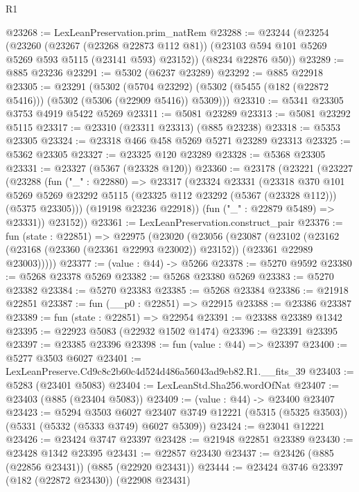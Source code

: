 \begin{lexlean}{R1}
\begin{coremodule}
@23268 := LexLeanPreservation.prim_natRem
@23288 := @23244
    (@23254
      (@23260
        (@23267 (@23268 @22873 @112 @81))
        (@23103 @594 @101 @5269 @5269 @593 @5115 (@23141 @593) @23152))
      (@8234 @22876 @50))
@23289 := @885 @23236
@23291 := @5302 (@6237 @23289)
@23292 := @885 @22918
@23305 := @23291
    (@5302
      (@5704 @23292)
      (@5302 (@5455 (@182 (@22872 @5416))) (@5302 (@5306 (@22909 @5416)) @5309)))
@23310 := @5341 @23305 @3753 @4919 @5422 @5269
@23311 := @5081 @23289
@23313 := @5081 @23292 @5115
@23317 := @23310 (@23311 @23313) (@885 @23238)
@23318 := @5353 @23305
@23324 := @23318 @466 @458 @5269 @5271 @23289 @23313
@23325 := @5362 @23305
@23327 := @23325 @120 @23289
@23328 := @5368 @23305
@23331 := @23327 (@5367 (@23328 @120))
@23360 := @23178
    (@23221
      (@23227
        (@23288
          (fun ("_" : @22880) =>
          @23317
            (@23324
              @23331
              (@23318
                @370
                @101
                @5269
                @5269
                @23292
                @5115
                (@23325 @112 @23292 (@5367 (@23328 @112)))
                (@5375 @23305)))
            (@19198 @23236 @22918))
          (fun ("_" : @22879 @5489) => @23331))
        @23152))
@23361 := LexLeanPreservation.construct_pair
@23376 := fun (state : @22851) =>
  @22975
    (@23020
      (@23056
        (@23087
          (@23102
            (@23162 (@23168 (@23360 (@23361 @22993 @23002)) @23152))
            (@23361 @22989 @23003)))))
@23377 := (value : @44) -> @5266
@23378 := @5270 @9592
@23380 := @5268 @23378 @5269
@23382 := @5268 @23380 @5269
@23383 := @5270 @23382
@23384 := @5270 @23383
@23385 := @5268 @23384
@23386 := @21918 @22851
@23387 := fun (__p0 : @22851) => @22915
@23388 := @23386 @23387
@23389 := fun (state : @22851) => @22954
@23391 := @23388 @23389 @1342
@23395 := @22923 @5083 (@22932 @1502 @1474)
@23396 := @23391 @23395
@23397 := @23385 @23396
@23398 := fun (value : @44) => @23397
@23400 := @5277 @3503 @6027
@23401 := LexLeanPreserve.Cd9c8c2b60c4d524d486a56043ad9eb82.R1.__fits_39
@23403 := @5283 (@23401 @5083)
@23404 := LexLeanStd.Sha256.wordOfNat
@23407 := @23403 (@885 (@23404 @5083))
@23409 := (value : @44) -> @23400 @23407
@23423 := @5294
    @3503
    @6027
    @23407
    @3749
    @12221
    (@5315 (@5325 @3503))
    (@5331 (@5332 (@5333 @3749) @6027 @5309))
@23424 := @23041 @12221
@23426 := @23424 @3747 @23397
@23428 := @21948 @22851 @23389
@23430 := @23428 @1342 @23395
@23431 := @22857 @23430
@23437 := @23426 (@885 (@22856 @23431)) (@885 (@22920 @23431))
@23444 := @23424 @3746 @23397 (@182 (@22872 @23430)) (@22908 @23431)

\end{coremodule}
\end{lexlean}
